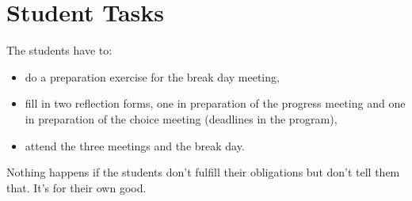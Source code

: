 \chapter{Student Tasks}

The students have to:

	\begin{itemize}

		\item do a preparation exercise for the break day meeting,

		\item fill in two reflection forms, one in preparation of the progress meeting and one in preparation of the choice meeting (deadlines in the program),

		\item attend the three meetings and the break day.

	\end{itemize}

Nothing happens if the students don't fulfill their obligations but don't tell them that.
It's for their own good.
